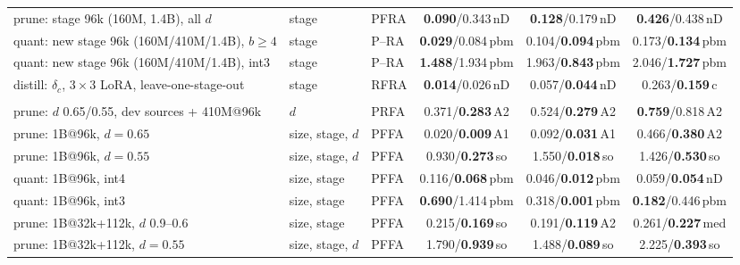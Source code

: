 \begin{table}[!t]
\begin{tabular}{@{}>{\raggedright\arraybackslash}p{4.15cm}>{\raggedright\arraybackslash}p{1.4cm}lccc@{}}
\addlinespace[1.5pt]
prune: stage 96k (160M, 1.4B), all $d$ & stage & PFRA & \textbf{0.090}/0.343{\scriptsize\,nD} & \textbf{0.128}/0.179{\scriptsize\,nD} & \textbf{0.426}/0.438{\scriptsize\,nD} \\
\addlinespace[1.5pt]
quant: new stage 96k (160M/410M/1.4B), $b\ge4$ & stage & P–RA & \textbf{0.029}/0.084{\scriptsize\,pbm} & 0.104/\textbf{0.094}{\scriptsize\,pbm} & 0.173/\textbf{0.134}{\scriptsize\,pbm} \\
quant: new stage 96k (160M/410M/1.4B), int3 & stage & P–RA & \textbf{1.488}/1.934{\scriptsize\,pbm} & 1.963/\textbf{0.843}{\scriptsize\,pbm} & 2.046/\textbf{1.727}{\scriptsize\,pbm} \\
\addlinespace[1.5pt]
distill: $\delta_c$, $3{\times}3$ LoRA, leave-one-stage-out & stage & RFRA & \textbf{0.014}/0.026{\scriptsize\,nD} & 0.057/\textbf{0.044}{\scriptsize\,nD} & 0.263/\textbf{0.159}{\scriptsize\,c} \\
\multicolumn{6}{@{}l}{\textit{Configuration axis: unseen setting, size, stage, or pool}} \\
prune: $d$ 0.65/0.55, dev sources + 410M@96k & $d$ & PRFA & 0.371/\textbf{0.283}{\scriptsize\,A2} & 0.524/\textbf{0.279}{\scriptsize\,A2} & \textbf{0.759}/0.818{\scriptsize\,A2} \\
prune: 1B@96k, $d=0.65$ & size, stage, $d$ & PFFA & 0.020/\textbf{0.009}{\scriptsize\,A1} & 0.092/\textbf{0.031}{\scriptsize\,A1} & 0.466/\textbf{0.380}{\scriptsize\,A2} \\
prune: 1B@96k, $d=0.55$ & size, stage, $d$ & PFFA & 0.930/\textbf{0.273}{\scriptsize\,so} & 1.550/\textbf{0.018}{\scriptsize\,so} & 1.426/\textbf{0.530}{\scriptsize\,so} \\
\addlinespace[1.5pt]
quant: 1B@96k, int4 & size, stage & PFFA & 0.116/\textbf{0.068}{\scriptsize\,pbm} & 0.046/\textbf{0.012}{\scriptsize\,pbm} & 0.059/\textbf{0.054}{\scriptsize\,nD} \\
quant: 1B@96k, int3 & size, stage & PFFA & \textbf{0.690}/1.414{\scriptsize\,pbm} & 0.318/\textbf{0.001}{\scriptsize\,pbm} & \textbf{0.182}/0.446{\scriptsize\,pbm} \\
\addlinespace[1.5pt]
prune: 1B@32k+112k, $d$ 0.9--0.6 & size, stage & PFFA & 0.215/\textbf{0.169}{\scriptsize\,so} & 0.191/\textbf{0.119}{\scriptsize\,A2} & 0.261/\textbf{0.227}{\scriptsize\,med} \\
prune: 1B@32k+112k, $d=0.55$ & size, stage, $d$ & PFFA & 1.790/\textbf{0.939}{\scriptsize\,so} & 1.488/\textbf{0.089}{\scriptsize\,so} & 2.225/\textbf{0.393}{\scriptsize\,so} \\

\end{tabular}
\end{table}
